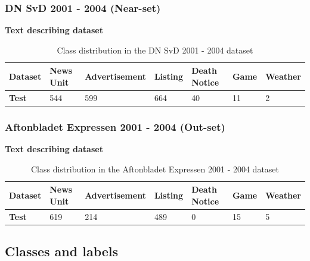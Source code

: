 \documentclass[english, bibtex]{kththesis}
\begin{document}
\subsubsection{DN SvD 2001 - 2004 (Near-set)}

\textbf{Text describing dataset}

\begin{table}[!ht]
  \begin{center}
    \caption{Class distribution in the  DN SvD 2001 - 2004 dataset}
    \label{tab:insetclassdist}
    \begin{tabular}{l|l|l|l|l|l|l} %
    \textbf{Dataset} & \textbf{News Unit} & \textbf{Advertisement} & \textbf{Listing} & \textbf{Death Notice} & \textbf{Game} & \textbf{Weather}  \\ 
    \hline
    \textbf{Test} & 544 & 599 & 664 & 40 & 11 & 2 \\    \hline
    \end{tabular}
  \end{center}
\end{table}

\subsubsection{Aftonbladet Expressen 2001 - 2004 (Out-set)}

\textbf{Text describing dataset}

\begin{table}[!ht]
  \begin{center}
    \caption{Class distribution in the  Aftonbladet Expressen 2001 - 2004 dataset}
    \label{tab:outsetclassdist}
    \begin{tabular}{l|l|l|l|l|l|l} %
    \textbf{Dataset} & \textbf{News Unit} & \textbf{Advertisement} & \textbf{Listing} & \textbf{Death Notice} & \textbf{Game} & \textbf{Weather}  \\ 
    \hline
    \textbf{Test} & 619 & 214 & 489 & 0 & 15 & 5 \\    \hline
    \end{tabular}
  \end{center}
\end{table}
\subsection{Classes and labels}
\end{document}
